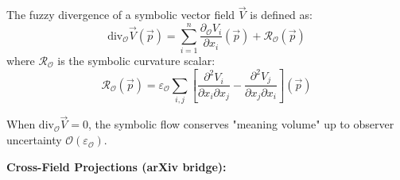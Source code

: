 \begin{theorem}
\label{theorem:fuzzy_divergence}
The fuzzy divergence of a symbolic vector field $\vec{V}$ is defined as:
\[
\text{div}_{\mathcal{O}} \vec{V}(\vec{p}) = \sum_{i=1}^n \frac{\partial_{\mathcal{O}} V_i}{\partial x_i}(\vec{p}) + \mathcal{R}_{\mathcal{O}}(\vec{p})
\]
where $\mathcal{R}_{\mathcal{O}}$ is the symbolic curvature scalar:
\[
\mathcal{R}_{\mathcal{O}}(\vec{p}) = \varepsilon_{\mathcal{O}} \sum_{i,j} \left[ \frac{\partial^2 V_i}{\partial x_i \partial x_j} - \frac{\partial^2 V_j}{\partial x_j \partial x_i} \right](\vec{p})
\]

When $\text{div}_{\mathcal{O}} \vec{V} = 0$, the symbolic flow conserves "meaning volume" up to observer uncertainty $\mathcal{O}(\varepsilon_{\mathcal{O}})$.
\end{theorem}


\vspace{1em}
\textbf{Cross-Field Projections (arXiv bridge):}

